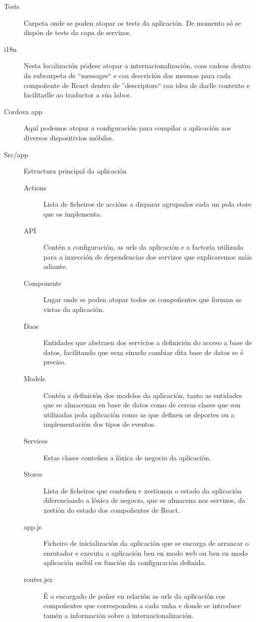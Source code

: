       \begin{description}
        \item [Tests] Carpeta onde se poden atopar os tests da aplicación. De 
momento só se dispón de tests da capa de servizos.
        \item [i18n] Nesta localización pódese atopar a internacionalización, 
coas cadeas dentro da subcarpeta de ``messages`` e coa descrición das mesmas 
para cada compoñente de React dentro de ''descriptors`` coa idea de darlle 
contexto e facilitarlle ao traductor a súa labor.
        \item [Cordova app] Aquí podemos atopar a configuración para compilar a 
aplicación aos diversos dispositivios móbiles.
        \item [Src/app] Estructura principal da aplicación
        \begin{description}
          \item [Actions] Lista de ficheiros de accións a disparar agrupados 
cada un pola store que os implementa.
          \item [API] Contén a configuración, as urls da aplicación e a 
factoría utilizada para a inxección de dependencias dos servizos que 
explicaremos máis adiante.
          \item [Components] Lugar onde se poden atopar todos os compoñentes 
que forman as vistas da aplicación. 
          \item [Daos] Entidades que abstraen dos servicios a definición do 
acceso a base de datos, facilitando que sexa sinxelo cambiar dita base de datos 
se é preciso.
          \item [Models] Contén a definición dos modelos da aplicación, tanto as 
entidades que se almacenan en base de datos como de cercas clases que son 
utilizadas pola aplicación como as que definen os deportes ou a implementación 
dos tipos de eventos.
          \item [Services] Estas clases conteñen a lóxica de negocio da 
aplicación.
          \item [Stores] Lista de ficheiros que conteñen e xestionan o estado da 
aplicación diferenciando a lóxica de negocio, que se almacena nos servizos, da 
xestión do estado dos compoñentes de React.
          \item [app.js] Ficheiro de inicialización da aplicación que se encarga 
de arrancar o enrutador e executa a aplicación ben en modo web ou ben en modo 
aplicación móbil en función da configuración definida.
          \item [router.jsx] É o encargado de poñer en relación as urls da 
aplicación cos compoñentes que corresponden a cada unha e donde se introduce 
tamén a información sobre a internacionalización.

        \end{description}

      \end{description}



